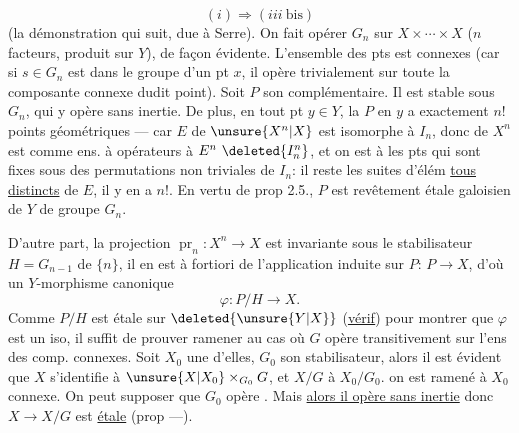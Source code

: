 \[
(i)\Longrightarrow(iii\ \mathrm{bis})
\]
(la démonstration  qui suit, due à  Serre).
On fait opérer $G_n$ sur $X\times\cdots\times X$ ($n$ facteurs, produit sur $Y$), de façon évidente.
L'ensemble des pts  est  connexes (car si $s\in G_n$ est dans le groupe  d'un pt $x$, il opère trivialement sur
toute la composante connexe dudit point).
Soit $P$ son complémentaire. Il est  stable sous $G_n$, qui y opère sans inertie.
De plus, en tout pt $y\in Y$, la  $P$ en $y$ a exactement $n!$ points géométriques --- car   $E$ de $\unsure{X^n|X}$ est isomorphe à $I_n$, donc  de $X^n$ est  comme ens. à opérateurs à $E^n\ \deleted{I_n^n}$, et on est à  les pts qui sont fixes sous des permutations non triviales de $I_n$: il reste les suites d'élém \uline{tous distincts} de $E$, il y en a $n!$.
En vertu de prop 2.5., $P$ est  revêtement étale galoisien de $Y$ de groupe $G_n$.

D'autre part,  la  projection
$\operatorname{pr}_n:X^n\to X$  est invariante sous le stabilisateur $H=G_{n-1}$ de $\{n\}$,  il en est à fortiori de l'application induite sur $P$: $P\to X$, d'où un  $Y$-morphisme canonique
\[
\varphi:P/H\longrightarrow X.
\]
Comme $P/H$ est étale sur $\deleted{\unsure{Y|X}}$ (\uline{vérif})  pour montrer que $\varphi$ est un iso, il suffit de prouver
ramener au cas où $G$ opère transitivement sur l'ens des comp. connexes.
Soit $X_0$  une d'elles, $G_0$ son stabilisateur, alors il est évident que $X$ s'identifie à $\unsure{X|X_0}\times_{G_0}G$, et $X/G$ à $X_0/G_0$.
 on est ramené à $X_0$ connexe.
On peut supposer que $G_0$ opère \uline{}.
Mais \uline{alors il opère sans inertie} donc $X\longrightarrow X/G$ est \uline{étale} (prop ---).


